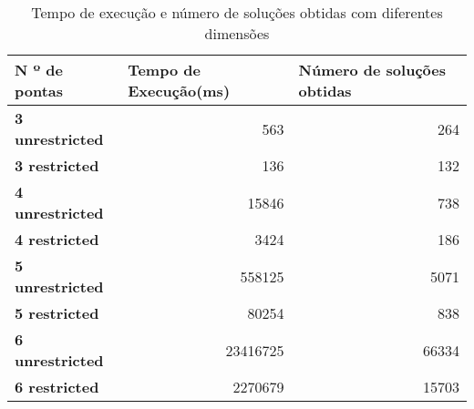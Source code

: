 \begin{table}[htbp]
  \centering
  \caption{Tempo de execução e número de soluções obtidas com diferentes dimensões}
    \begin{tabular}{lrr}\hline
    \textbf{N º de pontas} & \multicolumn{1}{l}{\textbf{Tempo de Execução(ms)}} & \multicolumn{1}{l}{\textbf{Número de soluções obtidas}} \\ \hline
    \textbf{3 unrestricted} & 563   & 264 \\
    \textbf{3 restricted} & 136   & 132 \\
    \textbf{4 unrestricted} & 15846 & 738 \\
    \textbf{4 restricted} & 3424  & 186 \\
    \textbf{5 unrestricted} & 558125 & 5071 \\
    \textbf{5 restricted} & 80254 & 838 \\
    \textbf{6 unrestricted } & 23416725 & 66334 \\
    \textbf{6 restricted} & 2270679 & 15703 \\ \hline
    \end{tabular}%
  \label{tab:tabela_all_solutions}%
\end{table}%

